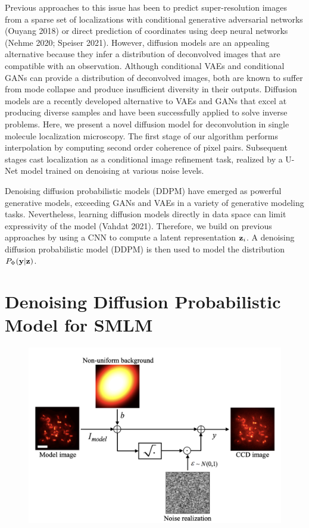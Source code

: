 \documentclass{article}
\begin{document}
Previous approaches to this issue has been to predict super-resolution images from a sparse set of localizations with conditional generative adversarial networks (Ouyang 2018) or direct prediction of coordinates using deep neural networks (Nehme 2020; Speiser 2021). However, diffusion models are an appealing alternative because they infer a distribution of deconvolved images that are compatible with an observation. Although conditional VAEs and conditional GANs can provide a distribution of deconvolved images, both are known to suffer from mode collapse and produce insufficient diversity in their outputs. Diffusion models are a recently developed alternative to VAEs and GANs that excel at producing diverse samples and have been successfully applied to solve inverse problems. Here, we present a novel diffusion model for deconvolution in single molecule localization microscopy. The first stage of our algorithm performs interpolation by computing second order coherence of pixel pairs. Subsequent stages cast localization as a conditional image refinement task, realized by a U-Net model trained on denoising at various noise levels. 

Denoising diffusion probabilistic models (DDPM) have emerged as powerful generative models, exceeding GANs and VAEs in a variety of generative modeling tasks. Nevertheless, learning diffusion models directly in data space can limit expressivity of the model (Vahdat 2021). Therefore, we build on previous approaches by using a CNN to compute a latent representation $\bold{z}_{i}$. A denoising diffusion probabilistic model (DDPM) is then used to model the distribution $P_{\Phi}(\bold{y}|\bold{z})$. 



\section{Denoising Diffusion Probabilistic Model for SMLM}

\begin{figure}
\includegraphics[scale=0.5]{Generation.png}
\end{figure}
\end{document}
